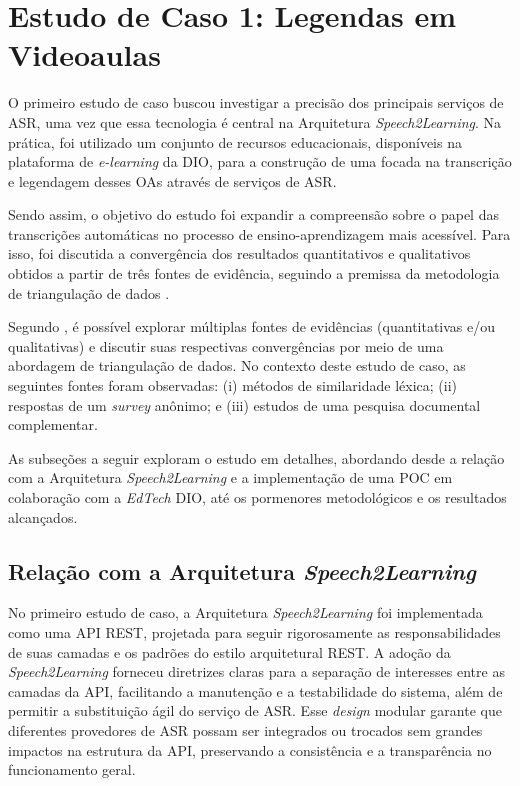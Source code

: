 \section{Estudo de Caso 1: Legendas em Videoaulas}
\label{c4:cs1}

O primeiro estudo de caso buscou investigar a precisão dos principais serviços de ASR, uma vez que essa tecnologia é central na Arquitetura \textit{Speech2Learning}. Na prática, foi utilizado um conjunto de recursos educacionais, disponíveis na plataforma de \textit{e-learning} da DIO, para a construção de uma  focada na transcrição e legendagem desses OAs através de serviços de ASR.

Sendo assim, o objetivo do estudo foi expandir a compreensão sobre o papel das transcrições automáticas no processo de ensino-aprendizagem mais acessível. Para isso, foi discutida a convergência dos resultados quantitativos e qualitativos obtidos a partir de três fontes de evidência, seguindo a premissa da metodologia de triangulação de dados \cite{LimaJunior2021}.

Segundo \cite{Farquhar2020}, é possível explorar múltiplas fontes de evidências (quantitativas e/ou qualitativas) e discutir suas respectivas convergências por meio de uma abordagem de triangulação de dados. No contexto deste estudo de caso, as seguintes fontes foram observadas: (i) métodos de similaridade léxica; (ii) respostas de um \textit{survey} anônimo; e (iii) estudos de uma pesquisa documental complementar.

As subseções a seguir exploram o estudo em detalhes, abordando desde a relação com a Arquitetura \textit{Speech2Learning} e a implementação de uma POC em colaboração com a \textit{EdTech} DIO, até os pormenores metodológicos e os resultados alcançados.

\subsection{Relação com a Arquitetura \textit{Speech2Learning}}

No primeiro estudo de caso, a Arquitetura \textit{Speech2Learning} foi implementada como uma API REST, projetada para seguir rigorosamente as responsabilidades de suas camadas e os padrões do estilo arquitetural REST. A adoção da \textit{Speech2Learning} forneceu diretrizes claras para a separação de interesses entre as camadas da API, facilitando a manutenção e a testabilidade do sistema, além de permitir a substituição ágil do serviço de ASR. Esse \textit{design} modular garante que diferentes provedores de ASR possam ser integrados ou trocados sem grandes impactos na estrutura da API, preservando a consistência e a transparência no funcionamento geral.

